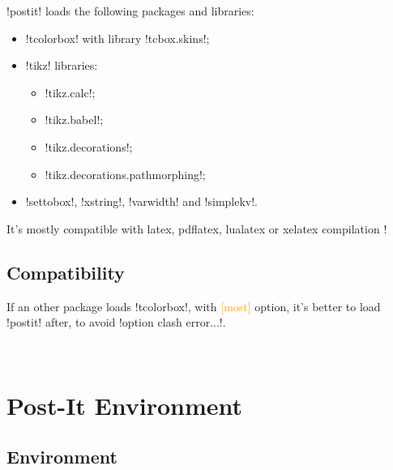 \documentclass[english,a4paper,11pt]{article}
\newcommand\Cle[1]{{\small\sffamily\textlangle \textcolor{orange}{#1}\textrangle}}
\begin{document}
\begin{noteblock}
\packagetex!postit! loads the following packages and libraries:

\begin{itemize}
	\item \packagetex!tcolorbox! with library \packagetex!tcbox.skins!;
	\item \packagetex!tikz! libraries:
	\begin{itemize}
		\item \packagetex!tikz.calc!;
		\item \packagetex!tikz.babel!;
		\item \packagetex!tikz.decorations!;
		\item \packagetex!tikz.decorations.pathmorphing!;
	\end{itemize}
	\item \packagetex!settobox!, \packagetex!xstring!, \packagetex!varwidth! and \packagetex!simplekv!.
\end{itemize}

It’s mostly compatible with \textsf{latex}, \textsf{pdflatex}, \textsf{lualatex} or \textsf{xelatex} compilation !
\end{noteblock}

\subsection{Compatibility}

\begin{cautionblock}
If an other package loads \packagetex!tcolorbox!, with \Cle{[most]} option, it's better to load \packagetex!postit! after, to avoid \motcletex!option clash error...!.
\end{cautionblock}


\vfill~

\pagebreak

\section{Post-It Environment}

\subsection{Environment}
\end{document}
